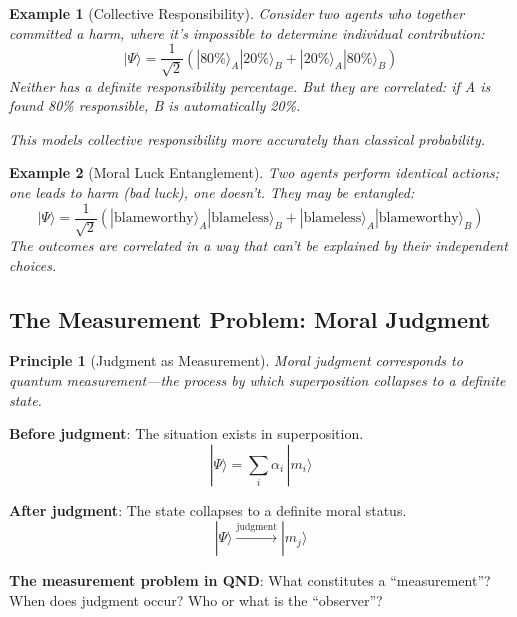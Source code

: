 \documentclass[12pt]{article}
\newtheorem{principle}{Principle}
\newtheorem{example}{Example}[section]
\begin{document}
\begin{example}[Collective Responsibility]
Consider two agents who together committed a harm, where it's impossible to determine individual contribution:
\begin{equation}
    |\Psi\rangle = \frac{1}{\sqrt{2}} \left( |80\%\rangle_A |20\%\rangle_B + |20\%\rangle_A |80\%\rangle_B \right)
\end{equation}
Neither has a definite responsibility percentage. But they are correlated: if A is found 80\% responsible, B is automatically 20\%.

This models collective responsibility more accurately than classical probability.
\end{example}

\begin{example}[Moral Luck Entanglement]
Two agents perform identical actions; one leads to harm (bad luck), one doesn't. They may be entangled:
\begin{equation}
    |\Psi\rangle = \frac{1}{\sqrt{2}} \left( |\text{blameworthy}\rangle_A |\text{blameless}\rangle_B + |\text{blameless}\rangle_A |\text{blameworthy}\rangle_B \right)
\end{equation}
The outcomes are correlated in a way that can't be explained by their independent choices.
\end{example}

\subsection{The Measurement Problem: Moral Judgment}

\begin{principle}[Judgment as Measurement]
\emph{Moral judgment corresponds to quantum measurement---the process by which superposition collapses to a definite state.}
\end{principle}

\textbf{Before judgment}: The situation exists in superposition.
\begin{equation}
    |\Psi\rangle = \sum_i \alpha_i \,|m_i\rangle
\end{equation}

\textbf{After judgment}: The state collapses to a definite moral status.
\begin{equation}
    |\Psi\rangle \xrightarrow{\text{judgment}} |m_j\rangle
\end{equation}

\textbf{The measurement problem in QND}: What constitutes a ``measurement''? When does judgment occur? Who or what is the ``observer''?
\end{document}
